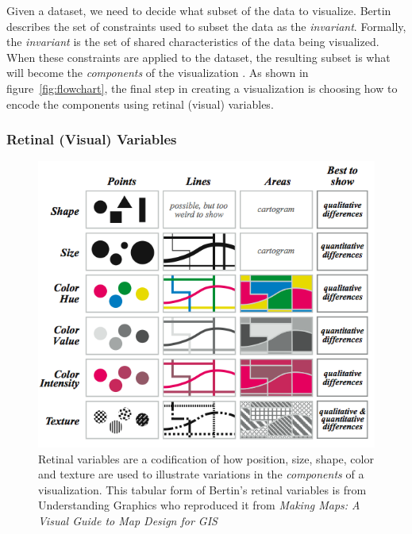 \documentclass[../main.tex]{subfiles}
\begin{document}
Given a dataset, we need to decide what subset of the data to visualize. Bertin describes the set of constraints used to subset the data as the \textit{invariant}. Formally, the \textit{invariant} is the set of shared characteristics of the data being visualized. When these constraints are applied to the dataset, the resulting subset is what will become the \textit{components} of the visualization \cite{bertinSemiologyGraphicsDiagrams2011a}. 
As shown in figure~\ref{fig:flowchart}, the final step in creating a visualization is choosing how to encode the
components using retinal (visual) variables.
 

\subsubsection{Retinal (Visual) Variables}
\label{sec:intro_visual_variables}
\begin{figure}[h!]
\includegraphics[width=1\textwidth]{figures/intro/retinal_variables.png}
\caption{Retinal variables are a codification of how position, size, shape, color and texture are used to illustrate variations in the \textit{components} of a visualization. This tabular form of Bertin's retinal variables is from Understanding Graphics \cite{malamedInformationDisplayTips2010} who reproduced it from \textit{Making Maps: A Visual Guide to Map Design for GIS} 
\cite{krygierMakingMapsVisual2005}}
\label{fig:retinal_variables}
\end{figure}
\end{document}
